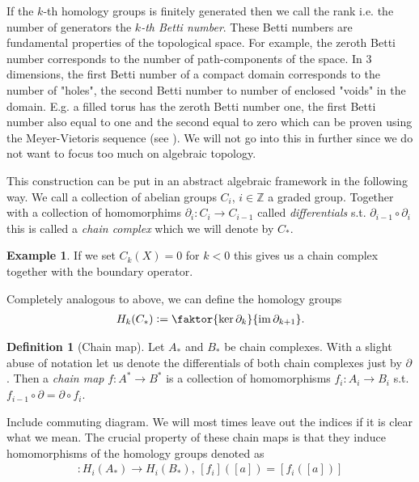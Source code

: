 \documentclass[12pt,a4paper]{article}
\numberwithin{equation}{subsection}
\numberwithin{lemma}{subsection}
\theoremstyle{definition}
\newtheorem{definition}[lemma]{Definition}
\newtheorem{example}[lemma]{Example}
\DeclareMathOperator{\Ima}{im}
\newcommand{\integers}{\mathbb{Z}}
\begin{document}
If the $k$-th homology groups is finitely generated then we 
call the rank i.e. the number of generators the \textit{$k$-th Betti number}. 
These Betti numbers are fundamental properties of the topological space. 
For example, the zeroth Betti number corresponds to the number of 
path-components of the space. In 3 dimensions, the first Betti number of 
a compact domain
corresponds to the number of "holes", the second Betti number to 
number of enclosed "voids" in the domain. E.g. a filled torus 
has the zeroth Betti number one, the first Betti number also equal to one
and the second equal to zero which can be proven using the Meyer-Vietoris sequence
(see \cite[Sec.\,IV.18]{topology_and_geometry}). We will not go into this in further
since we do not want to focus too much on algebraic topology.

This construction can be put in an abstract algebraic framework in the following 
way. We call a collection of abelian groups $C_i$, $i\in \integers$ a graded group.                                                   
Together with a collection of homomorphims $\partial_i: C_i \rightarrow C_{i-1}$ 
called \textit{differentials}
s.t. $\partial_{i-1} \circ \partial_i$ this is called a \textit{chain complex} which 
we will denote by $C_*$. 

\begin{example}
    If we set $C_k(X) = {0}$ for $k < 0$ this gives us a chain complex together with 
    the boundary operator. 
\end{example}

Completely analogous to above, we can define the homology groups 
\begin{align*}
    H_k(C_*) \vcentcolon= \faktor{\ker \partial_k}{\Ima \partial_{k+1}}.
\end{align*}

\begin{definition}[Chain map]
    Let $A_*$ and $B_*$ be chain complexes. With a slight abuse of notation
    let us denote the differentials of 
    both chain complexes just by $\partial$.
    Then a \textit{chain map} $f: A^* \rightarrow B^*$ is a collection 
    of homomorphisms $f_i: A_i \rightarrow B_i$ s.t. 
    $f_{i-1} \circ \partial = \partial \circ f_i$.
\end{definition}
{\color{red} Include commuting diagram.} We will most times leave out the 
indices if it is clear what we mean.
The crucial property of these chain maps is that they induce homomorphisms of
the homology groups denoted as
\begin{align*}
    [f_i]: H_i(A_*) \rightarrow H_i(B_*), \, [f_i]([a]) = [f_i([a])]
\end{align*}
\end{document}
